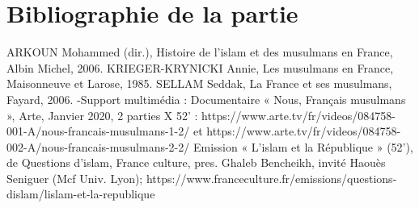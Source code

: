 \section{Bibliographie de la partie}
ARKOUN Mohammed (dir.), Histoire de l’islam et des musulmans en France, Albin
Michel, 2006.
KRIEGER-KRYNICKI Annie, Les musulmans en France, Maisonneuve et Larose,
1985.
SELLAM Seddak, La France et ses musulmans, Fayard, 2006.
-Support multimédia :
Documentaire « Nous, Français musulmans », Arte, Janvier 2020, 2 parties X 52’ :
https://www.arte.tv/fr/videos/084758-001-A/nous-francais-musulmans-1-2/ et
https://www.arte.tv/fr/videos/084758-002-A/nous-francais-musulmans-2-2/
Emission « L’islam et la République » (52’), de Questions d’islam, France culture,
pres. Ghaleb Bencheikh, invité Haouès Seniguer (Mcf Univ. Lyon);
https://www.franceculture.fr/emissions/questions-dislam/lislam-et-la-republique